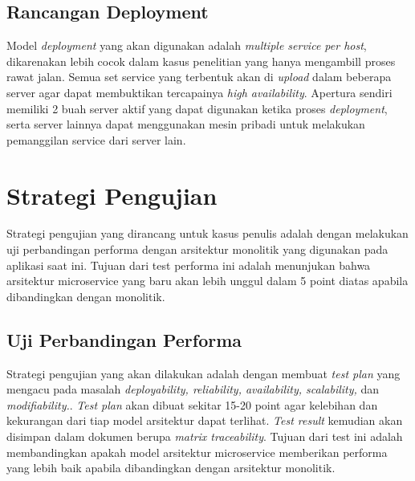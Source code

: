 \subsection{Rancangan Deployment}
Model \textit{deployment} yang akan digunakan adalah \textit{multiple service per host}, dikarenakan lebih cocok dalam kasus penelitian yang hanya mengambill proses rawat jalan. Semua set service yang terbentuk akan di \textit{upload} dalam beberapa server agar dapat membuktikan tercapainya \textit{high availability}. Apertura sendiri memiliki 2 buah server aktif yang dapat digunakan ketika proses \textit{deployment}, serta server lainnya dapat menggunakan mesin pribadi untuk melakukan pemanggilan service dari server lain.

\section{Strategi Pengujian}
Strategi pengujian yang dirancang untuk kasus penulis adalah dengan melakukan uji perbandingan performa dengan arsitektur monolitik yang digunakan pada aplikasi saat ini. Tujuan dari test performa ini adalah menunjukan bahwa arsitektur microservice yang baru akan lebih unggul dalam 5 point diatas apabila dibandingkan dengan monolitik.
\subsection{Uji Perbandingan Performa}
Strategi pengujian yang akan dilakukan adalah dengan membuat \textit{test plan} yang mengacu pada masalah \textit{deployability, reliability, availability, scalability,} dan \textit{modifiability.}. \textit{Test plan} akan dibuat sekitar 15-20 point agar kelebihan dan kekurangan dari tiap model arsitektur dapat terlihat. \textit{Test result} kemudian akan disimpan dalam dokumen berupa \textit{matrix traceability}.
Tujuan dari test ini adalah membandingkan apakah model arsitektur microservice memberikan performa yang lebih baik apabila dibandingkan dengan arsitektur monolitik.
\newpage